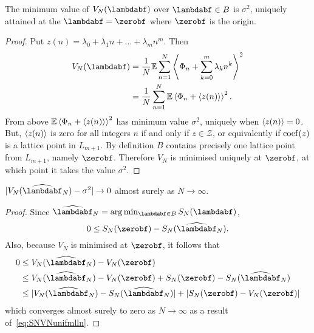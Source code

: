 \documentclass[journal]{IEEEtran}
\begin{document}
\begin{lemma}\label{lem:ES_Nminimisedzero}
The minimum value of $V_N(\lambdabf)$ over $\lambdabf \in B$ is $\sigma^2$, uniquely attained at the $\lambdabf = \zerobf$ where $\zerobf$ is the origin.
\end{lemma}
\begin{proof}
Put $z(n) = \lambda_0 + \lambda_1 n + \dots + \lambda_m n^m$.  Then
\begin{align*}
V_N(\lambdabf) &= \frac{1}{N}\expect\sum_{n=1}^{N}\fracpart{ \Phi_n + \sum_{k=0}^m{\lambda_k n^k} }^2 \\
&= \frac{1}{N}\sum_{n=1}^{N}\expect\fracpart{ \Phi_n + \fracpart{z(n)} }^2.
\end{align*}
From above ${\mathbb E}\left\langle  \Phi_n + \left\langle z(n) \right\rangle  \right\rangle^2$ has minimum value $\sigma^2$, uniquely when $\left\langle z(n) \right\rangle = 0$. But, $\left\langle z(n) \right\rangle$ is zero for all integers $n$ if and only if $z \in \mathcal{Z}$, or equivalently if $\operatorname{coef}(z)$ is a lattice point in $L_{m+1}$. By definition $B$ contains precisely one lattice point from $L_{m+1}$, namely $\zerobf$. Therefore $V_N$ is minimised uniquely at $\zerobf$, at which point it takes the value $\sigma^2$.
\end{proof}

\begin{lemma} \label{lem:ESNconv}
$\sabs{V_N(\widehat{\lambdabf}_N) - \sigma^2} \rightarrow 0$ almost surely as $N \rightarrow \infty$.
\end{lemma}
\begin{proof}
Since $\widehat{\lambdabf}_N =\arg\min_{\lambdabf\in B} S_N(\lambdabf)$, 
\[
0 \leq S_{N}(\zerobf) - S_N(\widehat{\lambdabf}_N).
\]  
Also, because $V_N$ is minimised at $\zerobf$, it follows that 
\begin{align*}
0 &\leq V_N(\widehat{\lambdabf}_N) - V_N(\zerobf) \\
 &\leq V_N(\widehat{\lambdabf}_N) - V_N(\zerobf) + S_{N}(\zerobf) - S_N(\widehat{\lambdabf}_N)   \\
&\leq \sabs{ V_N(\widehat{\lambdabf}_N) - S_N(\widehat{\lambdabf}_N) } + \sabs{ S_{N}(\zerobf) - V_N(\zerobf) }
\end{align*}
which converges almost surely to zero as $N\rightarrow\infty$ as a result of~\eqref{eq:SNVNunifmlln}.
\end{proof}
\end{document}
